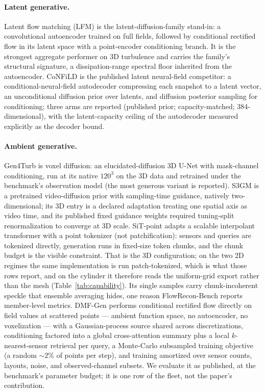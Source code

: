 \documentclass[aip,pof,reprint,amsmath,amssymb,superscriptaddress]{revtex4-1}
\newcommand{\dmfgen}{DMF-Gen}
\newcommand{\benchname}{FlowRecon-Bench}
\begin{document}
\paragraph{Latent generative.} Latent flow matching (LFM) is the
latent-diffusion-family stand-in:\cite{rombach2022high,du2024confild} a
convolutional autoencoder trained on full fields, followed by conditional
rectified flow in its latent space with a point-encoder conditioning branch.
It is the strongest aggregate performer on 3D turbulence and carries the
family's structural signature, a dissipation-range spectral floor inherited
from the autoencoder.\cite{glaws2020deep,rafiq2026spectrally}
CoNFiLD\cite{du2024confild} is the published latent neural-field competitor:
a conditional-neural-field autodecoder compressing each snapshot to a latent
vector, an unconditional diffusion prior over latents, and diffusion posterior
sampling for conditioning; three arms are reported (published prior;
capacity-matched; 384-dimensional), with the latent-capacity ceiling of the
autodecoder measured explicitly as the decoder bound.

\paragraph{Ambient generative.} Gen4Turb\cite{oommen2026turbulent} is voxel
diffusion: an elucidated-diffusion 3D U-Net with mask-channel conditioning,
run at its native $120^3$ on the 3D data and retrained under the benchmark's
observation model (the most generous variant is reported).
S3GM\cite{li2024s3gm} is a pretrained video-diffusion prior with
sampling-time guidance, natively two-dimensional; its 3D entry is a declared
adaptation treating one spatial axis as video time, and its published fixed
guidance weights required tuning-split renormalization to converge at 3D
scale. SiT-point adapts a scalable interpolant transformer\cite{ma2024sit}
with a point tokenizer (not patchification): sensors and queries are tokenized
directly, generation runs in fixed-size token chunks, and the chunk budget is
the visible constraint. That is the 3D configuration; on the two 2D regimes
the same implementation is run patch-tokenized, which is what those rows
report, and on the cylinder it therefore reads the uniform-grid export rather
than the mesh (Table~\ref{tab:capability}). Its single samples carry
chunk-incoherent speckle that ensemble averaging hides, one reason
\benchname{} reports member-level metrics.
\dmfgen{}\cite{wang2026dmfgen} performs conditional rectified flow directly on
field values at scattered points --- ambient function space, no autoencoder,
no voxelization --- with a Gaussian-process source shared across
discretizations, conditioning factored into a global cross-attention summary
plus a local $k$-nearest-sensor retrieval per query, a Monte-Carlo subsampled
training objective (a random ${\sim}2\%$ of points per step), and training
amortized over sensor counts, layouts, noise, and observed-channel subsets. We
evaluate it as published, at the benchmark's parameter budget; it is one row
of the fleet, not the paper's contribution.
\end{document}
